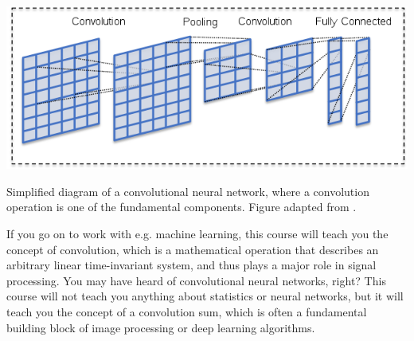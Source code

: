 \begin{marginfigure}[1cm]
	\begin{center}
		\includegraphics[width=\textwidth]{ch01/figures/cnn.png}
	\end{center}
	\caption{Simplified diagram of a convolutional neural network, where a convolution operation is one of the fundamental components. Figure adapted from \citep{maier2019gentle}.}
	\label{fig:cnn}
\end{marginfigure}

If you go on to work with e.g. machine learning, this course will teach you the concept of convolution,
which is a mathematical operation that describes an arbitrary linear time-invariant system, and thus plays
a major role in signal processing. You may have heard of convolutional neural networks, right?
This course will not teach you anything about statistics or neural networks, but it will teach you
the concept of a convolution sum, which is often a fundamental
building block of image processing or deep learning algorithms\cite{maier2019gentle}.


